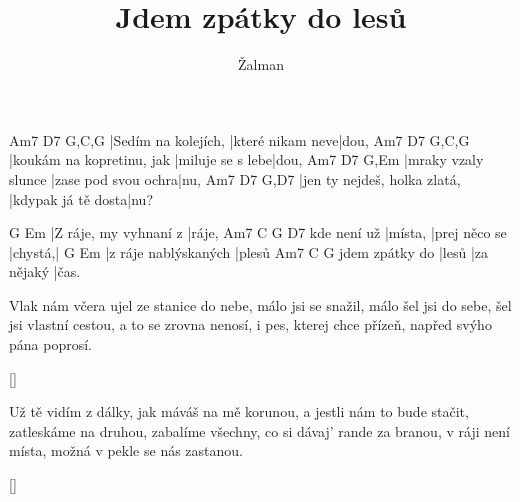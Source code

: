 \documentclass{song}
\title{Jdem zpátky do lesů}
\author{Žalman}
\begin{document}
\strophe
Am7                 D7               G,C,G
|Sedím na kolejích, |které nikam neve|dou,
Am7                       D7               G,C,G
|koukám na kopretinu, jak |miluje se s lebe|dou,
Am7                 D7                  G,Em
|mraky vzaly slunce |zase pod svou ochra|nu,
Am7                          D7                 G,D7
|jen ty nejdeš, holka zlatá, |kdypak já tě dosta|nu?
\endstrophe

G                     Em
|Z ráje, my vyhnaní z |ráje,
            Am7     C             G       D7
kde není už |místa, |prej něco se |chystá,|
G                    Em
|z ráje nablýskaných |plesů
               Am7   C          G
jdem zpátky do |lesů |za nějaký |čas.
\endstrophe

\strophe*
Vlak nám včera ujel ze stanice do nebe,
málo jsi se snažil, málo šel jsi do sebe,
šel jsi vlastní cestou, a to se zrovna nenosí,
i pes, kterej chce přízeň, napřed svýho pána poprosí.
\endstrophe

\ref{}

\strophe*
Už tě vidím z dálky, jak máváš na mě korunou,
a jestli nám to bude stačit, zatleskáme na druhou,
zabalíme všechny, co si dávaj' rande za branou,
v ráji není místa, možná v pekle se nás zastanou.
\endstrophe

\ref{}
\end{document}
